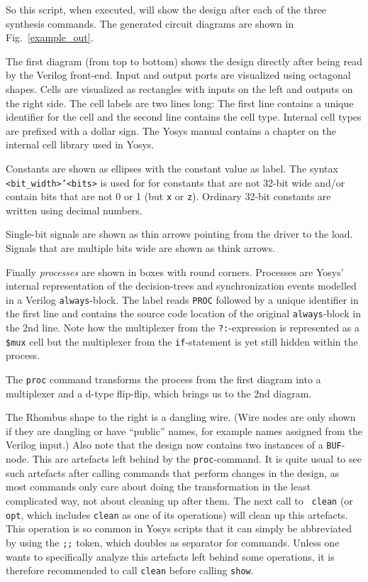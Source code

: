 \documentclass[9pt,technote,a4paper]{IEEEtran}
\begin{document}
So this script, when executed, will show the design after each of the three
synthesis commands. The generated circuit diagrams are shown in Fig.~\ref{example_out}.

The first diagram (from top to bottom) shows the design directly after being
read by the Verilog front-end. Input and output ports are visualized using
octagonal shapes. Cells are visualized as rectangles with inputs on the left
and outputs on the right side. The cell labels are two lines long: The first line
contains a unique identifier for the cell and the second line contains the cell
type. Internal cell types are prefixed with a dollar sign. The Yosys manual
contains a chapter on the internal cell library used in Yosys.

Constants are shown as ellipses with the constant value as label. The syntax
{\tt <bit\_width>'<bits>} is used for for constants that are not 32-bit wide
and/or contain bits that are not 0 or 1 (but {\tt x} or {\tt z}). Ordinary
32-bit constants are written using decimal numbers.

Single-bit signals are shown as thin arrows pointing from the driver to the
load. Signals that are multiple bits wide are shown as think arrows.

Finally {\it processes\/} are shown in boxes with round corners. Processes
are Yosys' internal representation of the decision-trees and synchronization
events modelled in a Verilog {\tt always}-block. The label reads {\tt PROC}
followed by a unique identifier in the first line and contains the source code
location of the original {\tt always}-block in the 2nd line. Note how the
multiplexer from the {\tt ?:}-expression is represented as a {\tt \$mux} cell
but the multiplexer from the {\tt if}-statement is yet still hidden within the
process.

\medskip

The {\tt proc} command transforms the process from the first diagram into a
multiplexer and a d-type flip-flip, which brings us to the 2nd diagram.

The Rhombus shape to the right is a dangling wire. (Wire nodes are only shown
if they are dangling or have "`public"' names, for example names assigned from
the Verilog input.) Also note that the design now contains two instances of a
{\tt BUF}-node. This are artefacts left behind by the {\tt proc}-command. It is
quite usual to see such artefacts after calling commands that perform changes
in the design, as most commands only care about doing the transformation in the
least complicated way, not about cleaning up after them. The next call to {\tt
clean} (or {\tt opt}, which includes {\tt clean} as one of its operations) will
clean up this artefacts.  This operation is so common in Yosys scripts that it
can simply be abbreviated by using the {\tt ;;} token, which doubles as
separator for commands. Unless one wants to specifically analyze this artefacts
left behind some operations, it is therefore recommended to call {\tt clean}
before calling {\tt show}.
\end{document}
